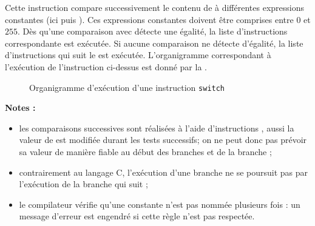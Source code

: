 Cette instruction compare successivement le contenu de  à différentes expressions constantes (ici  puis ). Ces expressions constantes doivent être comprises entre $0$ et $255$. Dès qu'une comparaison avec  détecte une égalité, la liste d'instructions correspondante est exécutée. Si aucune comparaison ne détecte d'égalité, la liste d'instructions qui suit le  est exécutée. L'organigramme correspondant à l'exécution de l'instruction  ci-dessus est donné par la .

\begin{figure}[!ht]
  \centering
  \small
  \caption{Organigramme d'exécution d'une instruction \texttt{switch}}
  \dotfill
\end{figure}


\textbf{Notes :}
\begin{itemize}
  \item les comparaisons successives sont réalisées à l'aide d'instructions , aussi la valeur de  est modifiée durant les tests successifs; on ne peut donc pas prévoir sa valeur de manière fiable au début des branches  et de la branche  ;
  \item contrairement au langage C, l'exécution d'une branche ne se poursuit pas par l'exécution de la branche qui suit ;
  \item le compilateur vérifie qu'une constante n'est pas nommée plusieurs fois : un message d'erreur est engendré si cette règle n'est pas respectée.
\end{itemize}


